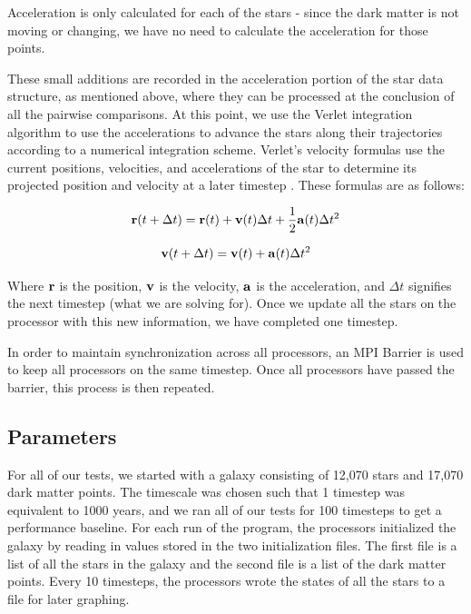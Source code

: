 \documentclass{article}
\begin{document}
Acceleration is only calculated for each of the stars - since the dark matter is not moving or changing, we have no need to calculate the acceleration for those points.

These small additions are recorded in the acceleration portion of the star data structure, as mentioned above, where they can be processed at the conclusion of all the pairwise comparisons.  At this point, we use the Verlet integration algorithm to use the accelerations to advance the stars along their trajectories according to a numerical integration scheme. Verlet's velocity formulas use the current positions, velocities, and accelerations of the star to determine its projected position and velocity at a later timestep \cite{verlet}.  These  formulas are as follows:
          
\begin{equation}
{\bf r}(t + \Delta t) = {\bf r}(t) + {\bf v}(t) \Delta t + \frac{1}{2} {\bf a}(t) \Delta t^{2}
\end{equation}         

\begin{equation}
{\bf v}(t + \Delta t) = {\bf v}(t) + {\bf a}(t) \Delta t^{2}
\end{equation}                                                                         

Where ${\bf r}$ is the position, ${\bf v}$ is the velocity, ${\bf a}$ is the acceleration, and $\Delta t$ signifies the next timestep (what we are solving for).  Once we update all the stars on the processor with this new information, we have completed one timestep.  

In order to maintain synchronization across all processors, an MPI Barrier is used to keep all processors on the same timestep.  Once all processors have passed the barrier, this process is then repeated. 

\subsection{Parameters}

For all of our tests, we started with a galaxy consisting of 12,070 stars and 17,070 dark matter points.  The timescale was chosen such that 1 timestep was equivalent to 1000 years, and we ran all of our tests for 100 timesteps to get a performance baseline.  For each run of the program, the processors initialized the galaxy by reading in values stored in the two initialization files.  The first file is a list of all the stars in the galaxy and the second file is a list of the dark matter points.  Every 10 timesteps, the processors wrote the states of all the stars to a file for later graphing.
\end{document}
